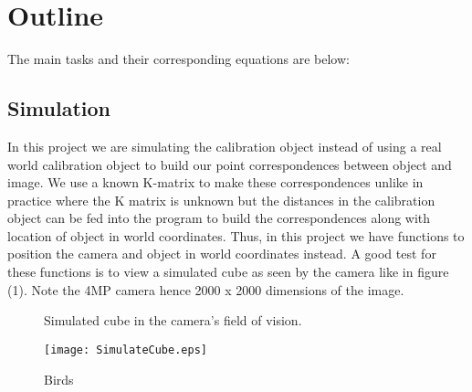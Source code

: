 \documentclass[titlepage]{article}
\begin{document}
\section{Outline}
The main tasks and their corresponding equations are below:
\subsection{Simulation}
In this project we are simulating the calibration object instead of using a real world calibration object to build our point correspondences between object and image. We use a known K-matrix to make these correspondences unlike in practice where the K matrix is unknown but the distances in the calibration object can be fed into the program to build the correspondences along with location of object in world coordinates. Thus, in this project we have functions to position the camera and object in world coordinates instead. A good test for these functions is to view a simulated cube as seen by the camera like in figure (1). Note the 4MP camera hence 2000 x 2000 dimensions of the image.
\begin{wrapfigure}{L}{4.5}
  \begin{center}
    \caption{Simulated cube in the camera's field of vision.}\label{wrap-fig:9}
    \texttt{[image: SimulateCube.eps]}
  \end{center}
  \caption{Birds}
\end{wrapfigure}
\end{document}
